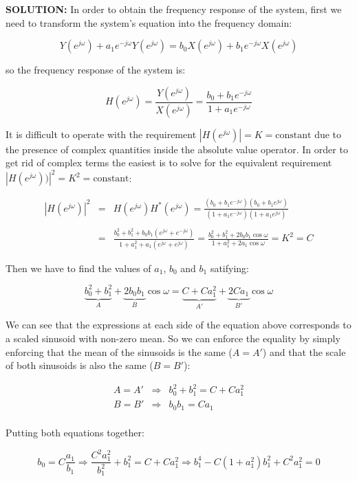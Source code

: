 \documentclass[a4paper,11pt,oneside]{article}
\begin{document}
\textbf{SOLUTION:}
In order to obtain the frequency response of the system, first we need to transform the system's equation into the frequency domain:

\[
Y(e^{j\omega})+a_1e^{-j\omega}Y(e^{j\omega})=b_0X(e^{j\omega})+b_1e^{-j\omega}X(e^{j\omega})
\]

so the frequency response of the system is:

\[
H(e^{j\omega})=\frac{Y(e^{j\omega})}{X(e^{j\omega})}=\frac{b_0+b_1e^{-j\omega}}{1+a_1e^{-j\omega}}
\]

It is difficult to operate with the requirement $|H(e^{j\omega})|=K=\textrm{constant}$ due to the presence of complex quantities inside the absolute value operator. In order to get rid of complex terms the easiest is to solve for the equivalent requirement $|H(e^{j\omega}))|^2=K^2=\textrm{constant}$:

\[
\begin{array}{lll}
|H(e^{j\omega})|^2&=&H(e^{j\omega})H^*(e^{j\omega})=\frac{(b_0+b_1e^{-j\omega})(b_0+b_1e^{j\omega})}{(1+a_1e^{-j\omega})(1+a_1e^{j\omega})}\\
\\
&=&\frac{b_0^2+b_1^2+b_0b_1\left(e^{j\omega}+e^{-j\omega}\right)}{1+a_1^2+a_1\left(e^{j\omega}+e^{j\omega}\right)}=\frac{b_0^2+b_1^2+2b_0b_1\cos\omega}{1+a_1^2+2a_1\cos\omega}=K^2=C
\end{array}
\]

Then we have to find the values of $a_1$, $b_0$ and $b_1$ satifying:

\[
\underbrace{b_0^2+b_1^2}_{A}+\underbrace{2b_0b_1}_{B}\cos\omega = \underbrace{C+Ca_1^2}_{A'}+\underbrace{2Ca_1}_{B'}\cos\omega
\]

We can see that the expressions at each side of the equation above corresponds to a scaled sinusoid with non-zero mean. So we can enforce the equality by simply enforcing that the mean of the sinusoids is the same ($A=A'$) and that the scale of both sinusoids is also the same ($B=B'$):

\[
\begin{array}{lll}
A = A' &\Rightarrow & b_0^2+b_1^2 = C+Ca_1^2\\
B = B' &\Rightarrow & b_0b_1 = Ca_1\\
\end{array}
\]

Putting both equations together:

\[
b_0=C\frac{a_1}{b_1}\Rightarrow \frac{C^2a_1^2}{b_1^2}+b_1^2=C+Ca_1^2\Rightarrow b_1^4-C(1+a_1^2)b_1^2+C^2a_1^2=0
\]
\end{document}
